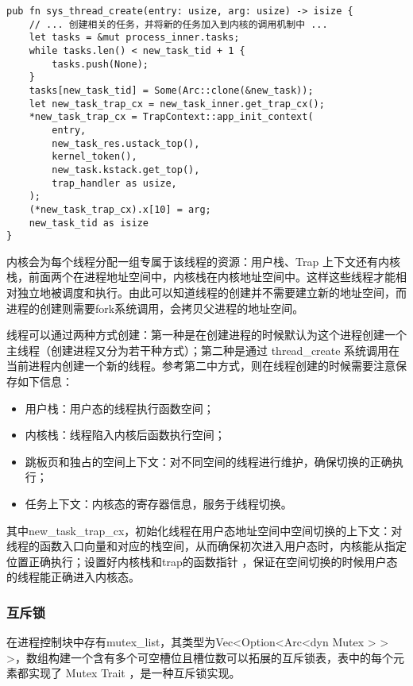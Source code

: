 \begin{lstlisting}[caption=sys\_thread\_create的系统调用]
pub fn sys_thread_create(entry: usize, arg: usize) -> isize {
    // ... 创建相关的任务，并将新的任务加入到内核的调用机制中 ...
    let tasks = &mut process_inner.tasks;
    while tasks.len() < new_task_tid + 1 {
        tasks.push(None);
    }
    tasks[new_task_tid] = Some(Arc::clone(&new_task));
    let new_task_trap_cx = new_task_inner.get_trap_cx();
    *new_task_trap_cx = TrapContext::app_init_context(
        entry,
        new_task_res.ustack_top(),
        kernel_token(),
        new_task.kstack.get_top(),
        trap_handler as usize,
    );
    (*new_task_trap_cx).x[10] = arg;
    new_task_tid as isize
}
\end{lstlisting}

内核会为每个线程分配一组专属于该线程的资源：用户栈、Trap 上下文还有内核栈，前面两个在进程地址空间中，内核栈在内核地址空间中。这样这些线程才能相对独立地被调度和执行。由此可以知道线程的创建并不需要建立新的地址空间，而进程的创建则需要fork系统调用，会拷贝父进程的地址空间。

线程可以通过两种方式创建：第一种是在创建进程的时候默认为这个进程创建一个主线程（创建进程又分为若干种方式）；第二种是通过 thread\_create 系统调用在当前进程内创建一个新的线程。参考第二中方式，则在线程创建的时候需要注意保存如下信息： 

\begin{itemize}
\item 用户栈：用户态的线程执行函数空间；
\item 内核栈：线程陷入内核后函数执行空间；
\item 跳板页和独占的空间上下文：对不同空间的线程进行维护，确保切换的正确执行；
\item 任务上下文：内核态的寄存器信息，服务于线程切换。
\end{itemize}

其中new\_task\_trap\_cx，初始化线程在用户态地址空间中空间切换的上下文：对线程的函数入口向量和对应的栈空间，从而确保初次进入用户态时，内核能从指定位置正确执行；设置好内核栈和trap的函数指针 ，保证在空间切换的时候用户态的线程能正确进入内核态。


\subsubsection{互斥锁}


在进程控制块中存有mutex\_list，其类型为Vec<Option<Arc<dyn Mutex > > >，数组构建一个含有多个可空槽位且槽位数可以拓展的互斥锁表，表中的每个元素都实现了 Mutex Trait ，是一种互斥锁实现。

